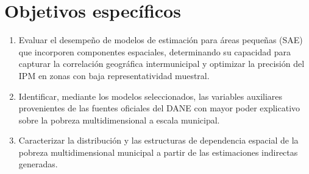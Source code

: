 \section{Objetivos específicos}

\begin{enumerate}
    \item Evaluar el desempeño de modelos de estimación para áreas pequeñas (SAE) que incorporen componentes espaciales, determinando su capacidad para capturar la correlación geográfica intermunicipal y optimizar la precisión del IPM en zonas con baja representatividad muestral.

    \item Identificar, mediante los modelos seleccionados, las variables auxiliares provenientes de las fuentes oficiales del DANE con mayor poder explicativo sobre la pobreza multidimensional a escala municipal.

    \item Caracterizar la distribución y las estructuras de dependencia espacial de la pobreza multidimensional municipal a partir de las estimaciones indirectas generadas.
\end{enumerate}


